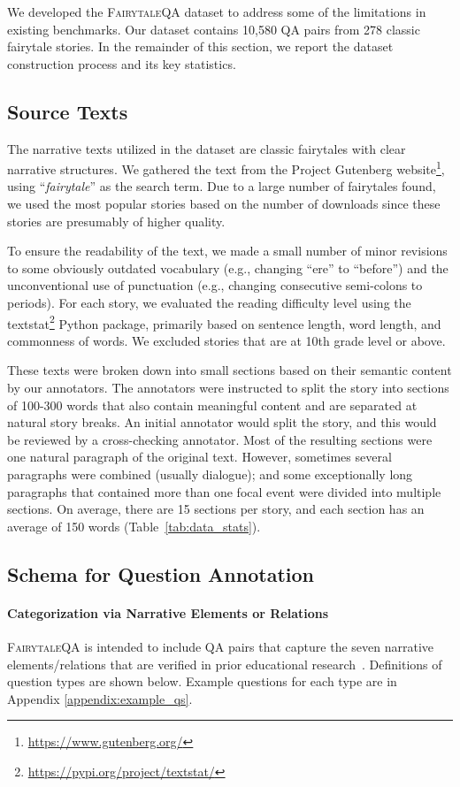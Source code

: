 \documentclass[11pt]{article}
\newcommand{\datasetname}{\textsc{FairytaleQA}\xspace}
\begin{document}
We developed the \datasetname dataset to address some of the limitations in existing benchmarks. Our dataset contains 10,580 QA pairs from 278 classic fairytale stories. In the remainder of this section, we report the dataset construction process and its key statistics.

\subsection{Source Texts}
The narrative texts utilized in the dataset are classic fairytales with clear narrative structures. We gathered the text from the Project Gutenberg website\footnote{\url{https://www.gutenberg.org/}}, using ``\emph{fairytale}'' as the search term. Due to a large number of fairytales found, we used the most popular stories based on the number of downloads since these stories are presumably of higher quality. 

To ensure the readability of the text, we made a small number of minor revisions to some obviously outdated vocabulary (e.g., changing ``ere'' to ``before'') and the unconventional use of punctuation (e.g., changing consecutive semi-colons to periods). For each story, we evaluated the reading difficulty level using the textstat\footnote{\url{https://pypi.org/project/textstat/}} Python package, primarily based on sentence length, word length, and commonness of words. We excluded stories that are at 10th grade level or above. 

These texts were broken down into small sections based on their semantic content by our annotators. The annotators were instructed to split the story into sections of 100-300 words that also contain meaningful content and are separated at natural story breaks. An initial annotator would split the story, and this would be reviewed by a cross-checking annotator. Most of the resulting sections were one natural paragraph of the original text. However, sometimes several paragraphs were combined (usually dialogue); and some exceptionally long paragraphs that contained more than one focal event were divided into multiple sections. On average, there are 15 sections per story, and each section has an average of 150 words (Table~\ref{tab:data_stats}). 


\subsection{Schema for Question Annotation}
\label{ssec:schema}
\paragraph{Categorization via Narrative Elements or Relations}
\datasetname is intended to include QA pairs that capture the seven narrative elements/relations that are verified in prior educational research~\cite{paris2003assessing}. Definitions of question types are shown below. Example questions for each type are in Appendix \ref{appendix:example_qs}.
\end{document}
